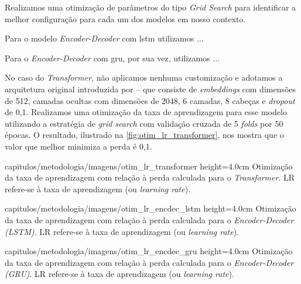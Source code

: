 

Realizamos uma otimização de parâmetros do tipo \textit{Grid Search} para identificar a melhor configuração para cada um dos modelos em nosso contexto. 

Para o modelo \textit{Encoder-Decoder} com \acrshort{lstm} utilizamos ...

Para o \textit{Encoder-Decoder} com \acrshort{gru}, por sua vez, utilizamos ...

No caso do \textit{Transformer}, não aplicamos nenhuma customização e adotamos a arquitetura original introduzida por \cite{vaswani-2017-transformer} -- que consiste de \textit{embeddings} com dimensões de 512, camadas ocultas com dimensões de 2048, 6 camadas, 8 cabeças e \textit{dropout} de 0,1.
Realizamos uma otimização da taxa de aprendizagem para esse modelo utilizando a estratégia de \textit{grid search} com validação cruzada de 5 \textit{folds} por 50 épocas. O resultado, ilustrado na \autoref{fig:otim_lr_transformer}, nos mostra que o valor que melhor minimiza a perda é 0,1.

    {capitulos/metodologia/imagens/otim_lr_transformer}
    {height=4.0cm}
    {Otimização da taxa de aprendizagem com relação à perda calculada para o \textit{Transformer}. LR refere-se à taxa de aprendizagem (ou \textit{learning rate}).}
    {}

    {capitulos/metodologia/imagens/otim_lr_encdec_lstm}
    {height=4.0cm}
    {Otimização da taxa de aprendizagem com relação à perda calculada para o \textit{Encoder-Decoder (LSTM)}. LR refere-se à taxa de aprendizagem (ou \textit{learning rate}).}
    {}


    {capitulos/metodologia/imagens/otim_lr_encdec_gru}
    {height=4.0cm}
    {Otimização da taxa de aprendizagem com relação à perda calculada para o \textit{Encoder-Decoder (GRU)}. LR refere-se à taxa de aprendizagem (ou \textit{learning rate}).}
    {}

